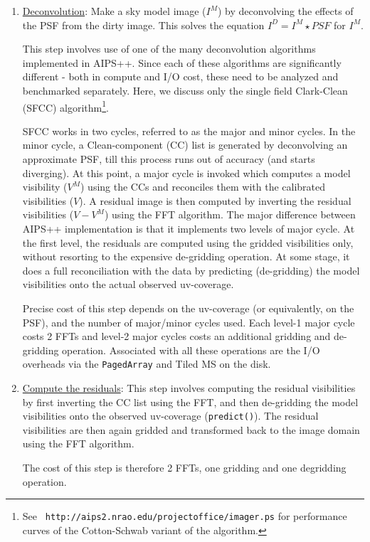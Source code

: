 \begin{enumerate}
\item \underline{Deconvolution}: Make a sky model image ($I^M$) by
      deconvolving the effects of the PSF  from the dirty image.  This
      solves the equation $I^D = I^M\star PSF$ for $I^M$.
\label{MakeIM}

This step involves use of one of the many deconvolution algorithms
implemented in AIPS++.  Since each of these algorithms are
significantly different - both in compute and I/O cost, these need to
be analyzed and benchmarked separately.  Here, we discuss only the
single field Clark-Clean (SFCC) algorithm\footnote{See {\tt
http://aips2.nrao.edu/projectoffice/imager.ps} for performance curves
of the Cotton-Schwab variant of the algorithm.}.

SFCC works in two cycles, referred to as the major and minor cycles.
In the minor cycle, a Clean-component (CC) list is generated by
deconvolving an approximate PSF, till this process runs out of
accuracy (and starts diverging).  At this point, a major cycle is
invoked which computes a model visibility ($V^M$) using the CCs and
reconciles them with the calibrated visibilities ($V$).  A residual
image is then computed by inverting the residual visibilities
($V-V^M$) using the FFT algorithm.  The major difference between
AIPS++ implementation is that it implements two levels of major cycle.
At the first level, the residuals are computed using the gridded
visibilities only, without resorting to the expensive de-gridding
operation.  At some stage, it does a full reconciliation with the data
by predicting (de-gridding) the model visibilities onto the actual
observed uv-coverage.

Precise cost of this step depends on the uv-coverage (or equivalently,
on the PSF), and the number of major/minor cycles used.  Each level-1
major cycle costs 2 FFTs and level-2 major cycles costs an additional
gridding and de-gridding operation.  Associated with all these
operations are the I/O overheads via the {\tt PagedArray} and Tiled MS
on the disk.


\item \underline{Compute the residuals}: This step involves computing
the residual visibilities by first inverting the CC list using the
FFT, and then de-gridding the model visibilities onto the observed
uv-coverage ({\tt predict()}).  The residual visibilities are then
again gridded and transformed back to the image domain using the FFT
algorithm.

The cost of this step is therefore 2 FFTs, one gridding and one
degridding operation.
\label{MakeRes}


\end{enumerate}
